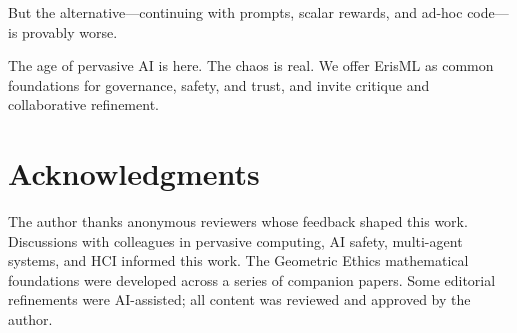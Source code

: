 \documentclass[conference]{IEEEtran}
\begin{document}
But the alternative---continuing with prompts, scalar rewards, and ad-hoc
code---is provably worse.

The age of pervasive AI is here. The chaos is real. We offer ErisML
as common foundations for governance, safety,
and trust, and invite critique and collaborative refinement.

\section*{Acknowledgments}

The author thanks anonymous reviewers whose feedback shaped this work.
Discussions with colleagues in pervasive computing, AI safety,
multi-agent systems, and HCI informed this work. The Geometric Ethics
mathematical foundations were developed across a series of companion papers. Some editorial refinements were AI-assisted; all content was reviewed and approved by the author.


\end{document}
